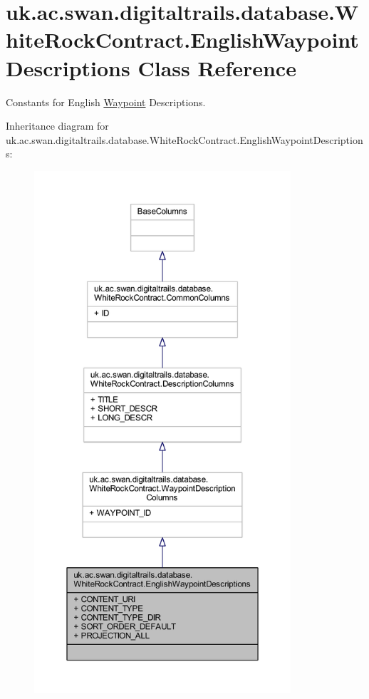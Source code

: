 \hypertarget{classuk_1_1ac_1_1swan_1_1digitaltrails_1_1database_1_1_white_rock_contract_1_1_english_waypoint_descriptions}{\section{uk.\+ac.\+swan.\+digitaltrails.\+database.\+White\+Rock\+Contract.\+English\+Waypoint\+Descriptions Class Reference}
\label{classuk_1_1ac_1_1swan_1_1digitaltrails_1_1database_1_1_white_rock_contract_1_1_english_waypoint_descriptions}
}


Constants for English \hyperlink{classuk_1_1ac_1_1swan_1_1digitaltrails_1_1database_1_1_white_rock_contract_1_1_waypoint}{Waypoint} Descriptions.  




Inheritance diagram for uk.\+ac.\+swan.\+digitaltrails.\+database.\+White\+Rock\+Contract.\+English\+Waypoint\+Descriptions\+:
\nopagebreak
\begin{figure}[H]
\begin{center}
\leavevmode
\includegraphics[height=550pt]{classuk_1_1ac_1_1swan_1_1digitaltrails_1_1database_1_1_white_rock_contract_1_1_english_waypoint_descriptions__inherit__graph}
\end{center}
\end{figure}


